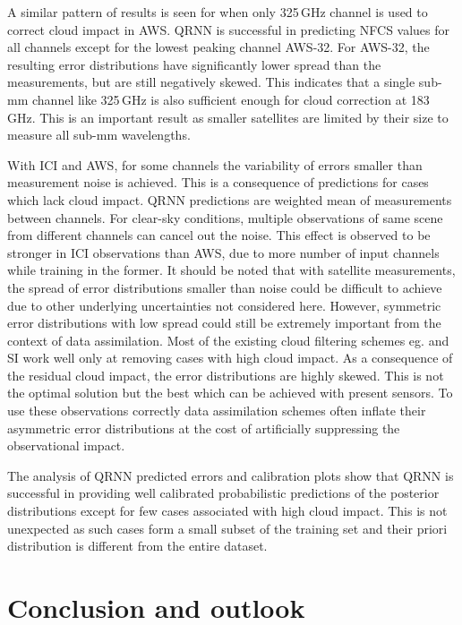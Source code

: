 \documentclass[amt, manuscript]{copernicus}
\begin{document}
A similar pattern of results is seen for when only 325\,GHz channel is used to correct cloud impact in AWS. QRNN is successful in predicting NFCS values for all channels except for the lowest peaking channel AWS-32. For AWS-32, the resulting error distributions have significantly lower spread than the measurements, but are still negatively skewed. This indicates that a single sub-mm channel like 325\,GHz is also sufficient enough for cloud correction at 183\,GHz. This is an important result as smaller satellites are limited by their size to measure all sub-mm wavelengths.

With ICI and AWS, for some channels the variability of errors smaller than measurement noise is achieved. This is a consequence of predictions for cases which lack cloud impact. QRNN predictions are weighted mean of measurements between channels. For clear-sky conditions, multiple observations of same scene from different channels can cancel out the noise. This effect is observed to be stronger in ICI observations than AWS, due to more number of input channels while training in the former. It should be noted that with satellite measurements, the spread of error distributions smaller than noise could be difficult to achieve due to other underlying uncertainties not considered here. However, symmetric error distributions with low spread could still be extremely important from the context of data assimilation. Most of the existing cloud filtering schemes eg. \citet{buehler:aclou:07} and SI \cite{geer2015scatteringindex} work well only at removing cases with high cloud impact. As a consequence of the residual cloud impact, the error distributions are highly skewed. This is not the optimal solution but the best which can be achieved with present sensors. To use these observations correctly data assimilation schemes often inflate their asymmetric error distributions at the cost of artificially suppressing the observational impact.  

The analysis of QRNN predicted errors and calibration plots show that QRNN is successful in providing well calibrated probabilistic predictions of the posterior distributions except for few cases associated with high cloud impact. This is not unexpected as such cases form a small subset of the training set and their priori distribution is different from the entire dataset. 

\section{Conclusion and outlook}  %
%
\end{document}
